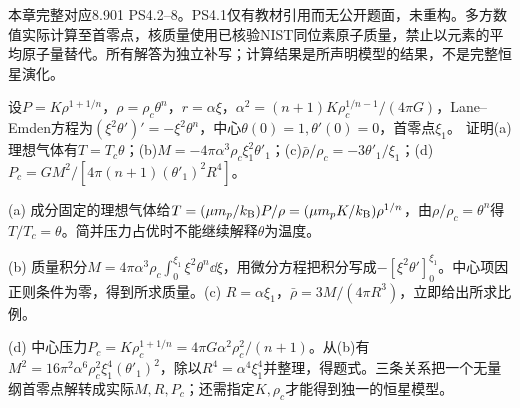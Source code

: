 本章完整对应8.901 PS4.2--8。PS4.1仅有教材引用而无公开题面，未重构。多方数值实际计算至首零点，核质量使用已核验NIST同位素原子质量，禁止以元素的平均原子量替代。所有解答为独立补写；计算结果是所声明模型的结果，不是完整恒星演化。

\begin{exercise}
设$P=K\rho^{1+1/n}$，$\rho=\rho_c\theta^n$，$r=\alpha\xi$，$\alpha^2=(n+1)K\rho_c^{1/n-1}/(4\pi G)$，Lane--Emden方程为$(\xi^2\theta')'=-\xi^2\theta^n$，中心$\theta(0)=1,\theta'(0)=0$，首零点$\xi_1$。
证明(a)理想气体有$T=T_c\theta$；(b)$M=-4\pi\alpha^3\rho_c\xi_1^2\theta'_1$；(c)$\bar\rho/\rho_c=-3\theta'_1/\xi_1$；(d)$P_c=GM^2/[4\pi(n+1)(\theta'_1)^2R^4]$。
\end{exercise}
\begin{solution}
(a) 成分固定的理想气体给$T=(\mu m_p/k_{\mathrm B})P/\rho=(\mu m_pK/k_{\mathrm B})\rho^{1/n}$，由$\rho/\rho_c=\theta^n$得$T/T_c=\theta$。简并压力占优时不能继续解释$\theta$为温度。

(b) 质量积分$M=4\pi\alpha^3\rho_c\int_0^{\xi_1}\xi^2\theta^n\dd\xi$，用微分方程把积分写成$-[\xi^2\theta']_0^{\xi_1}$。中心项因正则条件为零，得到所求质量。(c) $R=\alpha\xi_1$，$\bar\rho=3M/(4\pi R^3)$，立即给出所求比例。

(d) 中心压力$P_c=K\rho_c^{1+1/n}=4\pi G\alpha^2\rho_c^2/(n+1)$。从(b)有$M^2=16\pi^2\alpha^6\rho_c^2\xi_1^4(\theta'_1)^2$，除以$R^4=\alpha^4\xi_1^4$并整理，得题式。三条关系把一个无量纲首零点解转成实际$M,R,P_c$；还需指定$K,\rho_c$才能得到独一的恒星模型。
\end{solution}

